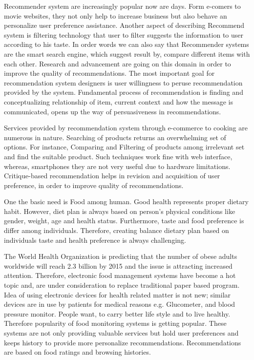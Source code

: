 Recommender system are increasingly popular now are days. Form e-comers to movie websites, they not only help to increase business but also behave an personalize user preference assistance. Another aspect of describing Recommend system is filtering technology that user to filter suggests the information to user according to his taste. In order words we can also say that Recommender systems are the smart search engine, which suggest result by, compare different items with each other. Research and advancement are going on this domain in order to improve the quality of recommendations. \newline 
The most important goal for recommendation system designers is user willingness to peruse recommendation provided by the system. Fundamental process of recommendation is finding and conceptualizing relationship of item, current context and how the message is communicated, opens up the way of persuasiveness in recommendations.\newline

Services provided by recommendation system through e-commerce to cooking are numerous in nature. Searching of products returns an overwhelming set of options. For instance, Comparing and Filtering of products among irrelevant set and find the suitable product. Such techniques work fine with web interface, whereas, smartphones they are not very useful due to hardware limitations. Critique-based recommendation helps in revision and acquisition of user preference, in order to improve quality of recommendations.\newline

One the basic need is Food among human. Good health represents proper dietary habit. However, diet plan is always based on person’s physical conditions like gender, weight, age and health status. Furthermore, taste and food preference is differ among individuals. Therefore, creating balance dietary plan based on individuals taste and health preference is always challenging.\newline

The World Health Organization \cite{world2008information} is predicting that the number of obese adults worldwide will reach 2.3 billion by 2015 and the issue is attracting increased attention. Therefore, electronic food management systems have become a hot topic and, are under consideration to replace traditional paper based program. Idea of using electronic devices for health related matter is not new; similar devices are in use by patients for medical reasons e.g. Glucometer, and blood pressure monitor. People want, to carry better life style and to live healthy. Therefore popularity of food monitoring systems is getting popular.  These systems are not only providing valuable services but hold user preferences and keeps history to provide more personalize recommendations. Recommendations are based on food ratings and browsing histories.\newline

